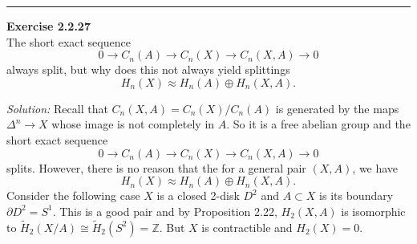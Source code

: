 \documentclass[a4paper, 12pt]{article}
\newenvironment{problem}[2][Exercise]
    { \begin{mdframed}[backgroundcolor=gray!20] \textbf{#1 #2} \\}
    {  \end{mdframed}}
\newenvironment{solution}
    {\textit{Solution:}}
    {}
\begin{document}
\noindent\rule{7in}{2.8pt}
\begin{problem}{2.2.27}
The short exact sequence 
\[0\rightarrow C_n(A)\rightarrow C_n(X)\rightarrow C_n(X,A)\rightarrow 0\]
always split, but why does this not always yield splittings 
\[H_n(X)\approx H_n(A)\oplus H_n(X,A).\]
\end{problem}
\begin{solution}
Recall that \(C_n(X,A)=C_n(X)/C_n(A)\) is generated by the maps \(\Delta^n\rightarrow X\) whose image is not completely in \(A\). So it is a free abelian group and the short exact sequence 
\[0\rightarrow C_n(A)\rightarrow C_n(X)\rightarrow C_n(X,A)\rightarrow 0\]
splits. However, there is no reason that the for a general pair \((X,A)\), we have 
\[H_n(X)\approx H_n(A)\oplus H_n(X,A).\]
Consider the following case \(X\) is a closed 2-disk \(D^2\) and \(A\subset X\) is its boundary \(\partial D^2=S^1\). This is a good pair and by Proposition 2.22, \(H_2(X,A)\) is isomorphic to 
\(\tilde{H}_2(X/A)\cong \tilde{H}_2(S^2)=\mathbb{Z}\). But \(X\) is contractible and \(H_2(X)=0\).
\end{solution}
\end{document}
